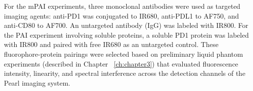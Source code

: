 For the mPAI experiments, three monoclonal antibodies were used as targeted imaging agents: anti-PD1 was conjugated to IR680, anti-PDL1 to AF750, and anti-CD80 to AF700. An untargeted antibody (IgG) was labeled with IR800. For the PAI experiment involving soluble proteins, a soluble PD1 protein was labeled with IR800 and paired with free IR680 as an untargeted control. These fluorophore-protein pairings were selected based on preliminary liquid phantom experiments (described in Chapter ~\ref{ch:chapter3}) that evaluated fluorescence intensity, linearity, and spectral interference across the detection channels of the Pearl imaging system.